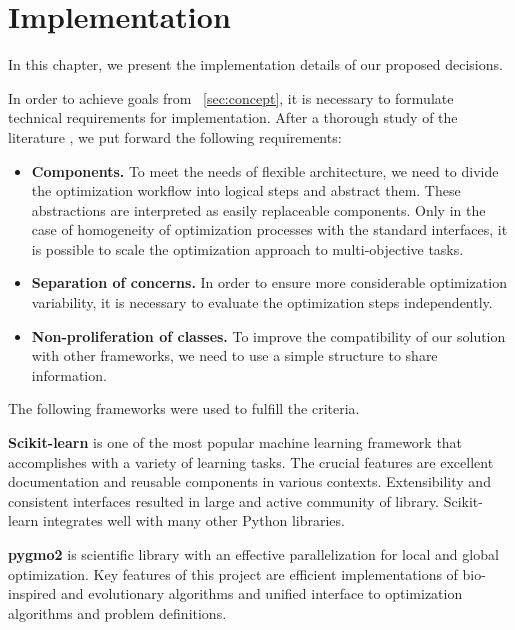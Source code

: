 \chapter{Implementation}

In this chapter, we present the implementation details of our proposed decisions. 

In order to achieve goals from ~\ref{sec:concept}, it is necessary to formulate technical requirements for implementation. After a thorough study of the literature \cite{buitinck2013api}, we put forward the following requirements:

\begin{itemize}
    \item \textbf{Components.} To meet the needs of flexible architecture, we need to divide the optimization workflow into logical steps and abstract them. These abstractions are interpreted as easily replaceable components. Only in the case of homogeneity of optimization processes with the standard interfaces, it is possible to scale the optimization approach to multi-objective tasks.
    \item \textbf{Separation of concerns.} In order to ensure more considerable optimization variability, it is necessary to evaluate the optimization steps independently.
    \item \textbf{Non-proliferation of classes.} To improve the compatibility of our solution with other frameworks, we need to use a simple structure to share information.
\end{itemize}

The following frameworks were used to fulfill the criteria.
\begin{description}
    \item \textbf{Scikit-learn} \cite{art-scikit-learn} is one of the most popular machine learning framework that accomplishes with a variety of learning tasks. The crucial features are excellent documentation and reusable components in various contexts. Extensibility and consistent interfaces resulted in large and active community of library. Scikit-learn integrates well with many other Python libraries. 
    \item \textbf{pygmo2} \cite{francesco_biscani_2019} is scientific library with an effective parallelization for local and global optimization. Key features of this project are efficient implementations of bio-inspired and evolutionary algorithms and unified interface to optimization algorithms and problem definitions. 
\end{description}


